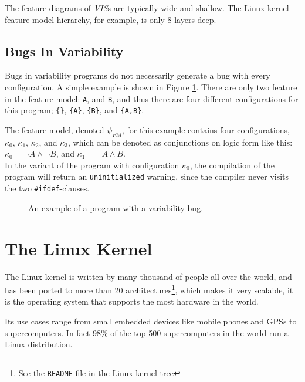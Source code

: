 \documentclass[a4paper,11pt]{report}
\newcommand{\f}{\footnote{\fn}}
\newcommand{\textcode}[1]{\fboxsep=1pt\texttt{\colorbox{gray!20}{#1}}}
\newcommand{\figa}{
    \begin{figure}[!htpb]
    \centering
}
\newcommand{\figb}[2]{
    \caption{#1}
    \label{#2}
    \end{figure}
}
\begin{document}
The feature diagrams of \emph{VIS}s are typically wide and shallow. The Linux 
kernel feature model hierarchy, for example, is only 8 layers deep\cite[p. 
17]{VarModSSD}.


            \subsection{Bugs In Variability}

Bugs in variability programs do not necessarily generate a bug with every 
configuration. A simple example is shown in Figure \ref{lst:varbug}. There are
only two feature in the feature model: \texttt{A}, and 
\texttt{B}, and thus there are four different configurations for this 
program; \texttt{\{\}}, \texttt{\{A\}}, \texttt{\{B\}}, and \texttt{\{A,B\}}.

The feature model, denoted $\psi_{FM}$, for this example contains four configurations, 
$\kappa_0$, $\kappa_1$, $\kappa_2$, and $\kappa_3$, which can be denoted as 
conjunctions on logic form like this: $\kappa_0 = \neg A \wedge \neg B$, and 
$\kappa_1 = \neg A \wedge B$.
\\

In the variant of the program with configuration $\kappa_0$, the compilation of 
the program will return an \texttt{uninitialized} warning, since the compiler 
never visits the two \textcode{\#ifdef}-clauses.

\figa
    \subfigure{
    
    }
\figb{An example of a program with a variability bug.}{lst:varbug}

            
            \section{The Linux Kernel}

            \def \fn {See the \textcode{README} file in the Linux kernel tree}

The Linux kernel is written by many thousand of people all over 
the world, and has been ported to more than 20 architectures\f, which makes it 
very scalable, it is the operating system that supports the most hardware in
the world\cite{22thbirthday,gkh}.

Its use cases range from small embedded devices like mobile phones and GPSs to 
supercomputers. In fact 98\% of the top 500 supercomputers in the world run a 
Linux distribution\cite{top500}. 
\\
\end{document}
